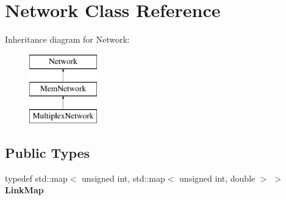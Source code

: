 \hypertarget{classNetwork}{}\section{Network Class Reference}
\label{classNetwork}
Inheritance diagram for Network\+:\begin{figure}[H]
\begin{center}
\leavevmode
\includegraphics[height=3.000000cm]{classNetwork}
\end{center}
\end{figure}
\subsection*{Public Types}
\begin{DoxyCompactItemize}
\item 
\mbox{\label{classNetwork_abde5619c679349a346350d7c703ef0fb}} 
typedef std\+::map$<$ unsigned int, std\+::map$<$ unsigned int, double $>$ $>$ {\bfseries Link\+Map}
\end{DoxyCompactItemize}
